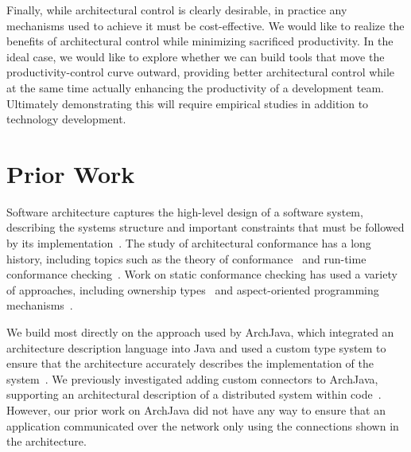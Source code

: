 \documentclass[runningheads]{llncs}
\begin{document}
\begin{sloppypar}
\begin{itemize}

\end{itemize}

Finally, while architectural control is clearly desirable, in practice any mechanisms used to achieve it must be cost-effective.  We would like to realize the benefits of architectural control while minimizing sacrificed productivity.  In the ideal case, we would like to explore whether we can build tools that move the productivity-control curve outward, providing better architectural control while at the same time actually enhancing the productivity of a development team.  Ultimately demonstrating this will require empirical studies in addition to technology development.


\section{Prior Work}

Software architecture captures the high-level design of a software system, describing the systems structure and important constraints that must be followed by its implementation~\cite{SG96,PW92}.  The study of architectural conformance has a long history, including topics such as the theory of conformance~\cite{MQR95} and run-time conformance checking~\cite{LV95}.  Work on static conformance checking has used a variety of approaches, including ownership types~\cite{AA09b} and aspect-oriented programming mechanisms~\cite{Merson-AOP-arch}.

We build most directly on the approach used by ArchJava, which integrated an architecture description language into Java and used a custom type system to ensure that the architecture accurately describes the implementation of the system~\cite{ACN02}.  We previously investigated adding custom connectors to ArchJava, supporting an architectural description of a distributed system within code~\cite{ASCN03}.  However, our prior work on ArchJava did not have any way to ensure that an application communicated over the network only using the connections shown in the architecture.


\end{sloppypar}
\end{document}
